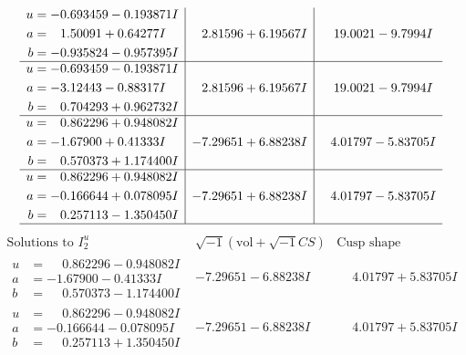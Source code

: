 \documentclass[1p]{elsarticle_modified}
\theoremstyle{definition}
\newcommand{\I}{\sqrt{-1}}
\begin{document}
$$\begin{array}{c|c|c}
\begin{aligned}
u &= -0.693459 - 0.193871 I \\
a &= \phantom{-}1.50091 + 0.64277 I \\
b &= -0.935824 - 0.957395 I\end{aligned}
 & \phantom{-}2.81596 + 6.19567 I & \phantom{-}19.0021 - 9.7994 I \\ \hline\begin{aligned}
u &= -0.693459 - 0.193871 I \\
a &= -3.12443 - 0.88317 I \\
b &= \phantom{-}0.704293 + 0.962732 I\end{aligned}
 & \phantom{-}2.81596 + 6.19567 I & \phantom{-}19.0021 - 9.7994 I \\ \hline\begin{aligned}
u &= \phantom{-}0.862296 + 0.948082 I \\
a &= -1.67900 + 0.41333 I \\
b &= \phantom{-}0.570373 + 1.174400 I\end{aligned}
 & -7.29651 + 6.88238 I & \phantom{-}4.01797 - 5.83705 I \\ \hline\begin{aligned}
u &= \phantom{-}0.862296 + 0.948082 I \\
a &= -0.166644 + 0.078095 I \\
b &= \phantom{-}0.257113 - 1.350450 I\end{aligned}
 & -7.29651 + 6.88238 I & \phantom{-}4.01797 - 5.83705 I\\
 \hline 
 \end{array}$$\newpage$$\begin{array}{c|c|c}  
\text{Solutions to }I^u_{2}& \I (\text{vol} + \sqrt{-1}CS) & \text{Cusp shape}\\
 \hline 
\begin{aligned}
u &= \phantom{-}0.862296 - 0.948082 I \\
a &= -1.67900 - 0.41333 I \\
b &= \phantom{-}0.570373 - 1.174400 I\end{aligned}
 & -7.29651 - 6.88238 I & \phantom{-}4.01797 + 5.83705 I \\ \hline\begin{aligned}
u &= \phantom{-}0.862296 - 0.948082 I \\
a &= -0.166644 - 0.078095 I \\
b &= \phantom{-}0.257113 + 1.350450 I\end{aligned}
 & -7.29651 - 6.88238 I & \phantom{-}4.01797 + 5.83705 I \\ \hline\begin{aligned}

\end{aligned}
\end{array}$$
\end{document}
